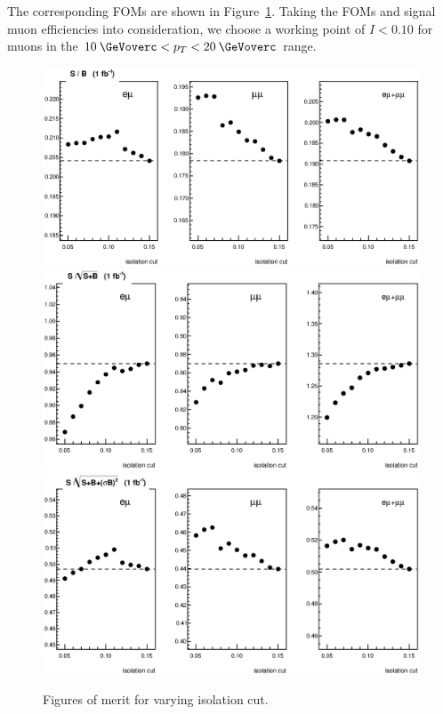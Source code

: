 The corresponding FOMs are shown in Figure~\ref{fig:isofoms}. Taking the FOMs and signal muon efficiencies into consideration, we choose a working point of $I<0.10$ for muons in the $10\:\GeVoverc < p_T < 20\:\GeVoverc$ range.
\begin{figure}[!htbp]
\begin{center}
\includegraphics[scale=0.55]{figures/iso_fom1.eps}
\includegraphics[scale=0.55]{figures/iso_fom2.eps}
\includegraphics[scale=0.55]{figures/iso_fom3.eps}
\caption{Figures of merit for varying isolation cut.}
\label{fig:isofoms}
\end{center}
\end{figure}

